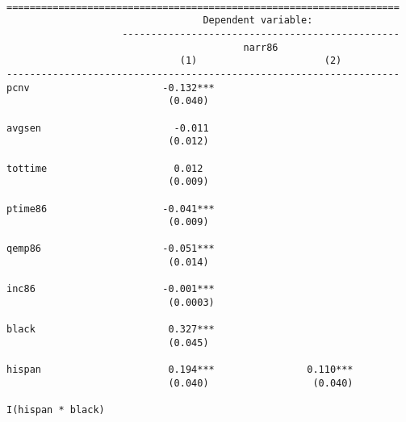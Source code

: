 \documentclass[
  letterpaper,
  DIV=11,
  numbers=noendperiod]{scrreprt}
\begin{document}
\begin{verbatim}

====================================================================
                                  Dependent variable:               
                    ------------------------------------------------
                                         narr86                     
                              (1)                      (2)          
--------------------------------------------------------------------
pcnv                       -0.132***                                
                            (0.040)                                 
                                                                    
avgsen                       -0.011                                 
                            (0.012)                                 
                                                                    
tottime                      0.012                                  
                            (0.009)                                 
                                                                    
ptime86                    -0.041***                                
                            (0.009)                                 
                                                                    
qemp86                     -0.051***                                
                            (0.014)                                 
                                                                    
inc86                      -0.001***                                
                            (0.0003)                                
                                                                    
black                       0.327***                                
                            (0.045)                                 
                                                                    
hispan                      0.194***                0.110***        
                            (0.040)                  (0.040)        
                                                                    
I(hispan * black)                                                   
                                                                    

\end{verbatim}
\end{document}
